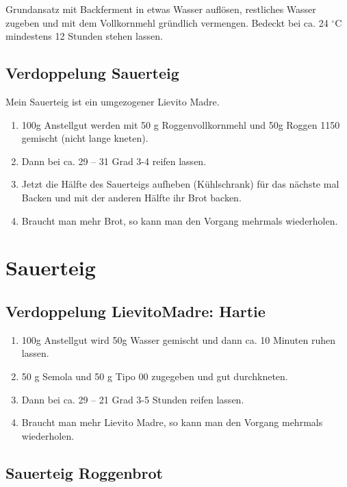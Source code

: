 Grundansatz mit Backferment in etwas Wasser auflösen, restliches Wasser zugeben und mit dem Vollkornmehl gründlich vermengen. Bedeckt bei ca. 24 $^{\circ} $C mindestens 12 Stunden stehen lassen. 

\section{Verdoppelung \Gls{Sauerteig}}\label{sec:Sauerteig}
Mein Sauerteig ist ein umgezogener Lievito Madre.  

\begin{enumerate}
    \item 100\;g Anstellgut werden mit 50\; g Roggenvollkornmehl und 50\;g Roggen 1150 gemischt (nicht lange kneten). 
    \item Dann bei ca. 29 -- 31 Grad 3-4 reifen lassen.
    \item Jetzt die Hälfte des Sauerteigs aufheben (Kühlschrank) für das nächste mal Backen und mit der anderen Hälfte ihr Brot backen.
    \item Braucht man mehr Brot, so kann man den Vorgang mehrmals wiederholen.
\end{enumerate}

\chapter{Sauerteig}

\section{Verdoppelung \Gls{LievitoMadre}: Hartie}\label{sec:Lievito Madre}

\begin{enumerate}
    \item 100\;g Anstellgut wird 50\;g Wasser gemischt und dann ca. 10 Minuten ruhen lassen.  
    \item 50 g Semola und 50 g Tipo 00 zugegeben und gut durchkneten.
    \item Dann bei ca. 29 -- 21 Grad 3-5 Stunden reifen lassen.
    \item Braucht man mehr Lievito Madre, so kann man den Vorgang mehrmals wiederholen.
\end{enumerate}

\section{Sauerteig Roggenbrot} 

